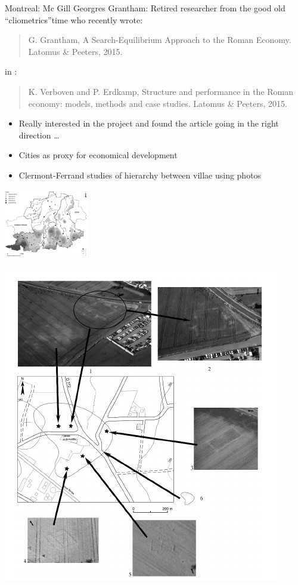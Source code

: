 \documentclass[9pt, handout=show,notes=show]{beamer}
\begin{document}
\begin{frame}{Montreal: Mc Gill}
    Georgres Grantham: Retired researcher from the good old ``cliometrics''time who recently wrote:
    \begin{quote}
	G. Grantham, A Search-Equilibrium Approach to the Roman Economy. Latomus \& Peeters, 2015.
    \end{quote}
    in :
    \begin{quote}
	K. Verboven and P. Erdkamp, Structure and performance in the Roman economy: models, methods and case studies. Latomus \& Peeters, 2015.
    \end{quote}


    \begin{itemize}
	\item Really interested in the project and found the article going in the right direction \dots
    \item Cities as proxy for economical development 
    \item Clermont-Ferrand studies of hierarchy between villae using photos
    \end{itemize}
    \includegraphics[height=3cm]{images/clermont.png}

    
\end{frame}
\begin{frame}
   \begin{center}
       \includegraphics[width=\textwidth]{images/clermontPhoto.png}
   \end{center}
\end{frame}
\end{document}
